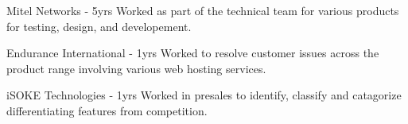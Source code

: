 

\begin{cvskills}

  \cvskill
    {Mitel Networks - 5yrs} %
    {Worked as part of the technical team for various products for testing, design, and developement.} %
  

  \cvskill
    {Endurance International - 1yrs} %
    {Worked to resolve customer issues across the product range involving various web hosting services. } %

  \cvskill
    {iSOKE Technologies - 1yrs} %
    {Worked in presales to identify, classify and catagorize differentiating features from competition.} %

\end{cvskills}
